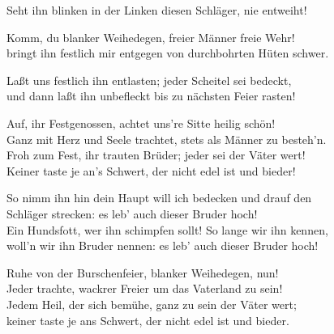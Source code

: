 \thestrophe Seht ihn blinken in der Linken diesen Schläger, nie entweiht! \\

\thestrophe Komm, du blanker Weihedegen, freier Männer freie Wehr! \\
bringt ihn festlich mir entgegen von durchbohrten Hüten schwer.

\thestrophe Laßt uns festlich ihn entlasten; jeder Scheitel sei bedeckt, \\
und dann laßt ihn unbefleckt bis zu nächsten Feier rasten!

\thestrophe Auf, ihr Festgenossen, achtet uns're Sitte heilig schön! \\
Ganz mit Herz und Seele trachtet, stets als Männer zu besteh'n. \\
Froh zum Fest, ihr trauten Brüder; jeder sei der Väter wert! \\
Keiner taste je an's Schwert, der nicht edel ist und bieder!

\thestrophe So nimm ihn hin dein Haupt will ich bedecken und drauf den \\
Schläger strecken: es leb' auch dieser Bruder hoch! \\
Ein Hundsfott, wer ihn schimpfen sollt! So lange wir ihn kennen, \\
woll'n wir ihn Bruder nennen: es leb' auch dieser Bruder hoch!

\thestrophe Ruhe von der Burschenfeier, blanker Weihedegen, nun! \\
Jeder trachte, wackrer Freier um das Vaterland zu sein! \\
Jedem Heil, der sich bemühe, ganz zu sein der Väter wert; \\
keiner taste je ans Schwert, der nicht edel ist und bieder.